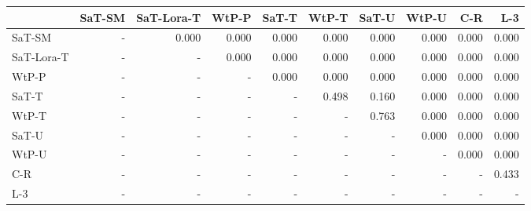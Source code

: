 \begin{tabular}{lrrrrrrrrr}
\toprule
 & SaT-SM & SaT-Lora-T & WtP-P & SaT-T & WtP-T & SaT-U & WtP-U & C-R & L-3 \\
\midrule
SaT-SM & - & 0.000 & 0.000 & 0.000 & 0.000 & 0.000 & 0.000 & 0.000 & 0.000 \\
SaT-Lora-T & - & - & 0.000 & 0.000 & 0.000 & 0.000 & 0.000 & 0.000 & 0.000 \\
WtP-P & - & - & - & 0.000 & 0.000 & 0.000 & 0.000 & 0.000 & 0.000 \\
SaT-T & - & - & - & - & 0.498 & 0.160 & 0.000 & 0.000 & 0.000 \\
WtP-T & - & - & - & - & - & 0.763 & 0.000 & 0.000 & 0.000 \\
SaT-U & - & - & - & - & - & - & 0.000 & 0.000 & 0.000 \\
WtP-U & - & - & - & - & - & - & - & 0.000 & 0.000 \\
C-R & - & - & - & - & - & - & - & - & 0.433 \\
L-3 & - & - & - & - & - & - & - & - & - \\
\bottomrule
\end{tabular}

